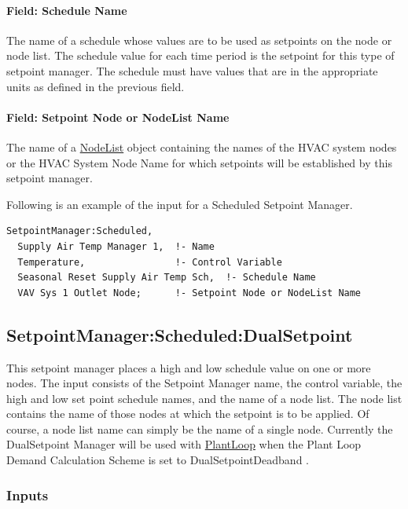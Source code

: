 \paragraph{Field: Schedule Name}\label{field-schedule-name-005}

The name of a schedule whose values are to be used as setpoints on the node or node list. The schedule value for each time period is the setpoint for this type of setpoint manager. The schedule must have values that are in the appropriate units as defined in the previous field.

\paragraph{Field: Setpoint Node or NodeList Name}\label{field-setpoint-node-or-nodelist-name}

The name of a \hyperref[nodelist]{NodeList} object containing the names of the HVAC system nodes or the HVAC System Node Name for which setpoints will be established by this setpoint manager.

Following is an example of the input for a Scheduled Setpoint Manager.

\begin{lstlisting}
SetpointManager:Scheduled,
  Supply Air Temp Manager 1,  !- Name
  Temperature,                !- Control Variable
  Seasonal Reset Supply Air Temp Sch,  !- Schedule Name
  VAV Sys 1 Outlet Node;      !- Setpoint Node or NodeList Name
\end{lstlisting}

\subsection{SetpointManager:Scheduled:DualSetpoint}\label{setpointmanagerscheduleddualsetpoint}

This setpoint manager places a high and low schedule value on one or more nodes. The input consists of the Setpoint Manager name, the control variable, the high and low set point schedule names, and the name of a node list. The node list contains the name of those nodes at which the setpoint is to be applied. Of course, a node list name can simply be the name of a single node. Currently the DualSetpoint Manager will be used with \hyperref[plantloop]{PlantLoop} when the Plant Loop Demand Calculation Scheme is set to DualSetpointDeadband .

\subsubsection{Inputs}\label{inputs-1-040}


